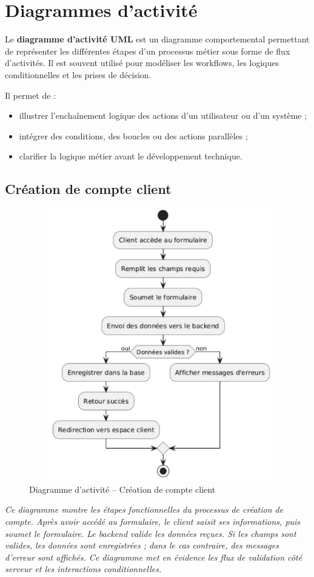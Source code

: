 \section{Diagrammes d’activité}
Le \textbf{diagramme d’activité UML} est un diagramme comportemental permettant de représenter les différentes étapes d’un processus métier sous forme de flux d’activités. Il est souvent utilisé pour modéliser les workflows, les logiques conditionnelles et les prises de décision.

Il permet de :
\begin{itemize}
    \item illustrer l’enchaînement logique des actions d’un utilisateur ou d’un système ;
    \item intégrer des conditions, des boucles ou des actions parallèles ;
    \item clarifier la logique métier avant le développement technique.
\end{itemize}

\subsection*{Création de compte client}
\begin{figure}[H]
\centering
\includegraphics[width=0.60\linewidth]{figures/Activité – Création de compte client.png}
\caption{Diagramme d’activité – Création de compte client}
\end{figure}
\textit{Ce diagramme montre les étapes fonctionnelles du processus de création de compte. Après avoir accédé au formulaire, le client saisit ses informations, puis soumet le formulaire. Le backend valide les données reçues. Si les champs sont valides, les données sont enregistrées ; dans le cas contraire, des messages d’erreur sont affichés. Ce diagramme met en évidence les flux de validation côté serveur et les interactions conditionnelles.}

